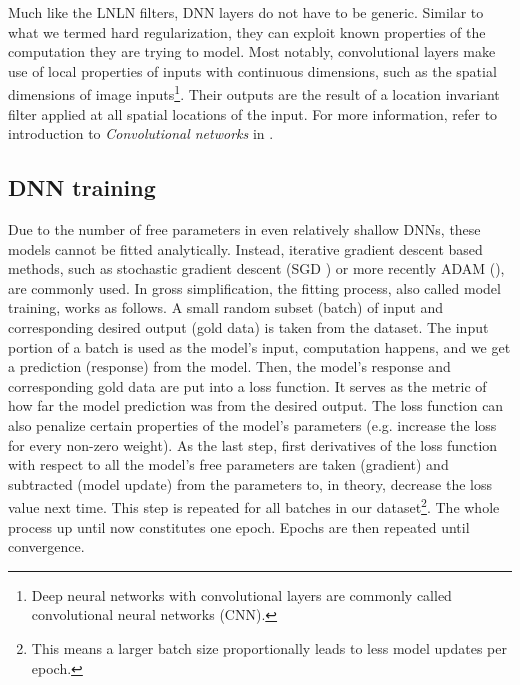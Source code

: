 
Much like the LNLN filters, DNN layers do not have to be generic. Similar to what we termed hard regularization, they can exploit known properties of the computation they are trying to model. Most notably, convolutional layers make use of local properties of inputs with continuous dimensions, such as the spatial dimensions of image inputs\footnote{Deep neural networks with convolutional layers are commonly called convolutional neural networks (CNN).}. Their outputs are the result of a location invariant filter applied at all spatial locations of the input. For more information, refer to introduction to \textit{Convolutional networks} in \cite{thesis_hojdar}.

\subsection{DNN training}\label{ch:1.3.2}

Due to the number of free parameters in even relatively shallow DNNs, these models cannot be fitted analytically. Instead, iterative gradient descent based methods, such as stochastic gradient descent (SGD \citep{kiefer1952}) or more recently ADAM (\citep{kingma2014adam}), are commonly used. In gross simplification, the fitting process, also called model training, works as follows. A small random subset (batch) of input and corresponding desired output (gold data) is taken from the dataset. The input portion of a batch is used as the model’s input, computation happens, and we get a prediction (response) from the model. Then, the model’s response and corresponding gold data are put into a loss function. It serves as the metric of how far the model prediction was from the desired output. The loss function can also penalize certain properties of the model’s parameters (e.g. increase the loss for every non-zero weight). As the last step, first derivatives of the loss function with respect to all the model’s free parameters are taken (gradient) and subtracted (model update) from the parameters to, in theory, decrease the loss value next time. This step is repeated for all batches in our dataset\footnote{This means a larger batch size proportionally leads to less model updates per epoch.}. The whole process up until now constitutes one epoch. Epochs are then repeated until convergence.

